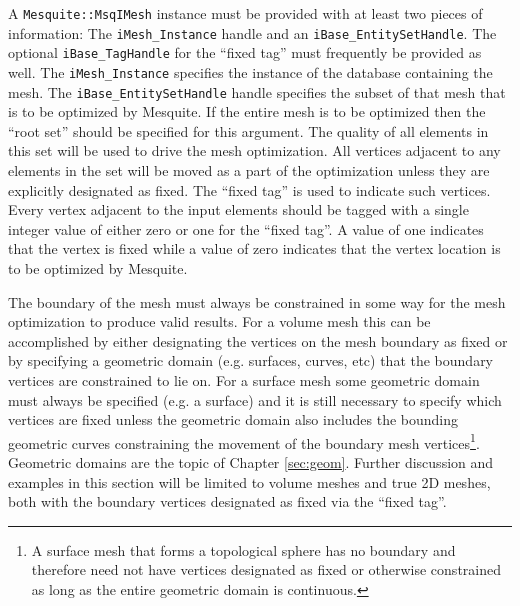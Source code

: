 A \texttt{Mesquite::MsqIMesh} instance must be provided with at least two pieces of information: The \texttt{iMesh\_Instance} handle and an \texttt{iBase\_EntitySetHandle}.  The optional \texttt{iBase\_TagHandle} for the ``fixed tag'' must frequently be provided as well.  The \texttt{iMesh\_Instance} specifies the instance of the database containing the mesh.  The \texttt{iBase\_EntitySetHandle} handle specifies the subset of that mesh that is to be optimized by Mesquite.  If the entire mesh is to be optimized then the ``root set'' should be specified for this argument.  The quality of all elements in this set will be used to drive the mesh optimization.  All vertices adjacent to any elements in the set will be moved as a part of the optimization unless they are explicitly designated as fixed.  The ``fixed tag'' is used to indicate such vertices.  Every vertex adjacent to the input elements should be tagged with a single integer value of either zero or one for the ``fixed tag''.  A value of one indicates that the vertex is fixed while a value of zero indicates that the vertex location is to be optimized by Mesquite.

The boundary of the mesh must always be constrained in some way for the mesh optimization to produce valid results.  For a volume mesh this can be accomplished by either designating the vertices on the mesh boundary as fixed or by specifying a geometric domain (e.g. surfaces, curves, etc) that the boundary vertices are constrained to lie on.  For a surface mesh some geometric domain must always be specified (e.g. a surface) and it is still necessary to specify which vertices are fixed unless the geometric domain also includes the bounding geometric curves constraining the movement of the boundary mesh vertices\footnote{A surface mesh that forms a topological sphere has no boundary and therefore need not have vertices designated as fixed or otherwise constrained as long as the entire geometric domain is continuous.}.  Geometric domains are the topic of Chapter \ref{sec:geom}.  Further discussion and examples in this section will be limited to volume meshes and true 2D meshes, both with the boundary vertices designated as fixed via the ``fixed tag''. 

